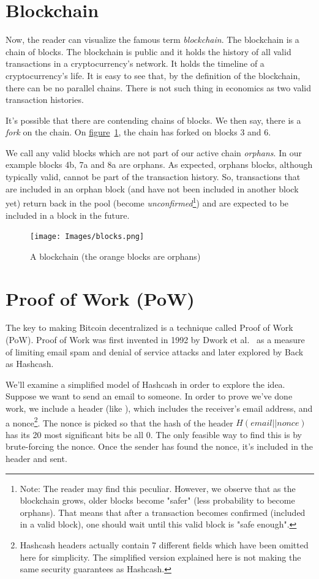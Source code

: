 \section{\label{sec:blockchain}Blockchain}
Now, the reader can visualize the famous term \emph{blockchain}. The blockchain is a chain of blocks. The blockchain is public and it holds the history of all valid transactions in a cryptocurrency's network. It holds the timeline of a cryptocurrency's life. It is easy to see that, by the definition of the blockchain, there can be no parallel chains. There is not such thing in economics as two valid transaction histories.

It's possible that there are contending chains of blocks. We then say, there is a \emph{fork} on the chain. On \hyperref[fig:blocks]{figure}~\ref{fig:blocks}, the chain has forked on blocks 3 and 6.

We call any valid blocks which are not part of our active chain \emph{orphans}. In our example blocks 4b, 7a and 8a are orphans. As expected, orphans blocks, although typically valid, cannot be part of the transaction history. So, transactions that are included in an orphan block (and have not been included in another block yet) return back in the pool (become \emph{unconfirmed}\footnote{Note: The reader may find this peculiar. However, we observe that as the blockchain grows, older blocks become "safer" (less probability to become orphans). That means that after a transaction becomes confirmed (included in a valid block), one should wait until this valid block is "safe enough".}) and are expected to be included in a block in the future.

\begin{figure}[H]
  \centering
  \texttt{[image: Images/blocks.png]}
  \caption{A blockchain (the orange blocks are orphans)~\cite{mastering}}
  \label{fig:blocks}
\end{figure}

\section{\label{proofOfWork}Proof of Work (PoW)}
The key to making Bitcoin decentralized is a technique called Proof of Work (PoW). Proof of Work was first invented in 1992 by Dwork et al.~\cite{dwork} as a measure of limiting email spam and denial of service attacks and later explored by Back~\cite{hashcash} as Hashcash.

We'll examine a simplified model of Hashcash in order to explore the idea. Suppose we want to send an email to someone. In order to prove we've done work, we include a header (like ), which includes the receiver's email address, and a nonce\footnote{Hashcash headers actually contain 7 different fields which have been omitted here for simplicity. The simplified version explained here is not making the same security guarantees as Hashcash.}. The nonce is picked so that the hash of the header $H(email || nonce)$ has its 20 most significant bits be all 0. The only feasible way to find this is by brute-forcing the nonce. Once the sender has found the nonce, it's included in the header and sent.

